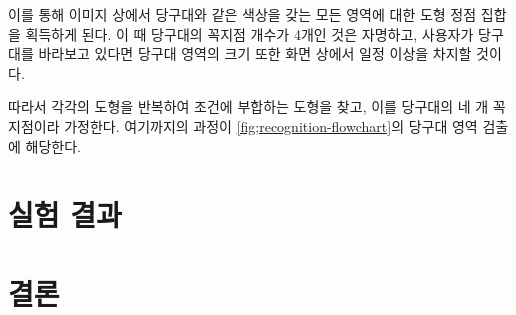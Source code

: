 \documentclass[10pt]{oblivoir}
\begin{document}
이를 통해 이미지 상에서 당구대와 같은 색상을 갖는 모든 영역에 대한 도형 정점 집합을 획득하게 된다. 이 때 당구대의 꼭지점 개수가 4개인 것은 자명하고, 사용자가 당구대를 바라보고 있다면 당구대 영역의 크기 또한 화면 상에서 일정 이상을 차지할 것이다.

따라서 각각의 도형을 반복하여 조건에 부합하는 도형을 찾고, 이를 당구대의 네 개 꼭지점이라 가정한다. 여기까지의 과정이 \cref{fig;recognition-flowchart}의 당구대 영역 검출에 해당한다.





\section{실험 결과}



\section{결론}



\end{document}
